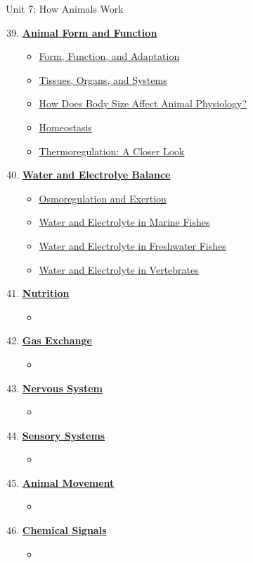 \documentclass[12pt,letterpaper]{article}
\begin{document}
\begin{chapbox}{Unit 7: How Animals Work}{ 
\begin{enumerate}[font=\bfseries, wide]
    \setcounter{enumi}{38}
\item \hyperlink{39}{\textbf{Animal Form and Function}}
    \begin{itemize}
        \item \hyperlink{39.1}{Form, Function, and Adaptation}
        \item \hyperlink{39.2}{Tissues, Organs, and Systems}
        \item \hyperlink{39.3}{How Does Body Size Affect Animal Physiology?}
        \item \hyperlink{39.4}{Homeostasis}
        \item \hyperlink{39.5}{Thermoregulation: A Closer Look}
    \end{itemize}
\item \hyperlink{40}{\textbf{Water and Electrolye Balance}}
    \begin{itemize}
        \item \hyperlink{40.1}{Osmoregulation and Exertion}
        \item \hyperlink{40.2}{Water and Electrolyte in Marine Fishes}
        \item \hyperlink{40.3}{Water and Electrolyte in Freshwater Fishes}
        \item \hyperlink{40.5}{Water and Electrolyte in Vertebrates}
    \end{itemize}
\item \hyperlink{41}{\textbf{Nutrition}}
    \begin{itemize}
        \item 
    \end{itemize}
\item \hyperlink{42}{\textbf{Gas Exchange}}
    \begin{itemize}
        \item 
    \end{itemize}
\item \hyperlink{43}{\textbf{Nervous System}}
    \begin{itemize}
        \item 
    \end{itemize}
\item \hyperlink{44}{\textbf{Sensory Systems}}
    \begin{itemize}
        \item 
    \end{itemize}
\item \hyperlink{45}{\textbf{Animal Movement}}
    \begin{itemize}
        \item 
    \end{itemize}
\item \hyperlink{46}{\textbf{Chemical Signals}}
    \begin{itemize}
        \item 
    \end{itemize}
\end{enumerate}
}\end{chapbox}
\end{document}
